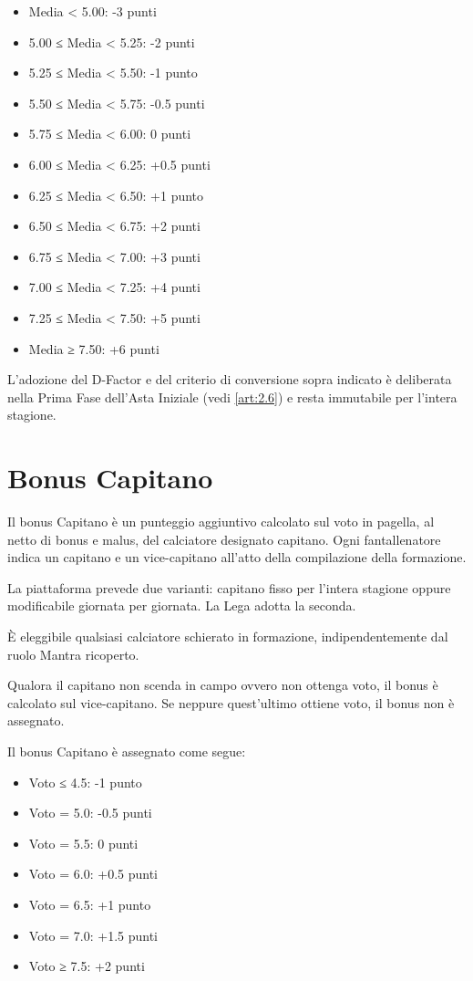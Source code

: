 \begin{itemize}
    \item Media < 5.00: -3 punti
    \item 5.00 ≤ Media < 5.25: -2 punti
    \item 5.25 ≤ Media < 5.50: -1 punto
    \item 5.50 ≤ Media < 5.75: -0.5 punti
    \item 5.75 ≤ Media < 6.00: 0 punti
    \item 6.00 ≤ Media < 6.25: +0.5 punti
    \item 6.25 ≤ Media < 6.50: +1 punto
    \item 6.50 ≤ Media < 6.75: +2 punti
    \item 6.75 ≤ Media < 7.00: +3 punti
    \item 7.00 ≤ Media < 7.25: +4 punti
    \item 7.25 ≤ Media < 7.50: +5 punti
    \item Media ≥ 7.50: +6 punti
\end{itemize}

L'adozione del D-Factor e del criterio di conversione sopra indicato è deliberata nella Prima Fase dell'Asta Iniziale (vedi \ref{art:2.6}) e resta immutabile per l'intera stagione.

\section{Bonus Capitano}
\label{art:5.5}

Il bonus Capitano è un punteggio aggiuntivo calcolato sul voto in pagella, al netto di bonus e malus, del calciatore designato capitano. Ogni fantallenatore indica un capitano e un vice-capitano all'atto della compilazione della formazione.

La piattaforma prevede due varianti: capitano fisso per l'intera stagione oppure modificabile giornata per giornata. La Lega adotta la seconda.

È eleggibile qualsiasi calciatore schierato in formazione, indipendentemente dal ruolo Mantra ricoperto.

Qualora il capitano non scenda in campo ovvero non ottenga voto, il bonus è calcolato sul vice-capitano. Se neppure quest'ultimo ottiene voto, il bonus non è assegnato.

Il bonus Capitano è assegnato come segue:

\begin{itemize}
    \item Voto ≤ 4.5: -1 punto
    \item Voto = 5.0: -0.5 punti
    \item Voto = 5.5: 0 punti
    \item Voto = 6.0: +0.5 punti
    \item Voto = 6.5: +1 punto
    \item Voto = 7.0: +1.5 punti
    \item Voto ≥ 7.5: +2 punti
\end{itemize}

